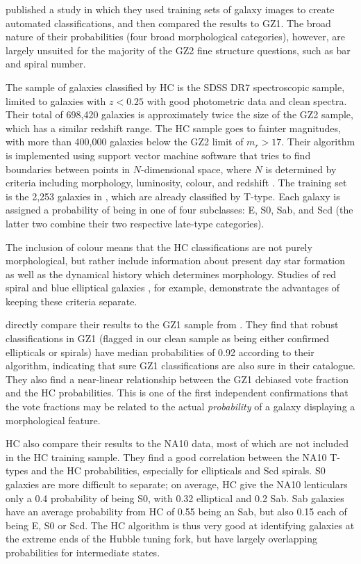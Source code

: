 \documentclass[useAMS,usenatbib]{mn2e}
\begin{document}
\citet[][HC]{hue11} published a study in which they used training sets of galaxy images to create automated classifications, and then compared the results to GZ1. The broad nature of their probabilities (four broad morphological categories), however, are largely unsuited for the majority of the GZ2 fine structure questions, such as bar and spiral number. 

The sample of galaxies classified by HC is the SDSS DR7 spectroscopic sample, limited to galaxies with $z<0.25$ with good photometric data and clean spectra. Their total of 698,420 galaxies is approximately twice the size of the GZ2 sample, which has a similar redshift range. The HC sample goes to fainter magnitudes, with more than 400,000 galaxies below the GZ2 limit of $m_r>17$. Their algorithm is implemented using support vector machine software that tries to find boundaries between points in $N$-dimensional space, where $N$ is determined by criteria including morphology, luminosity, colour, and redshift \citep{hue08}. The training set is the 2,253 galaxies in \citet{fuk07}, which are already classified by T-type. Each galaxy is assigned a probability of being in one of four subclasses: E, S0, Sab, and Scd (the latter two combine their two respective late-type categories). 

The inclusion of colour means that the HC classifications are not purely morphological, but rather include information about present day star formation as well as the dynamical history which determines morphology. Studies of red spiral \citep{mas10a} and blue elliptical galaxies \citep{sch09}, for example, demonstrate the advantages of keeping these criteria separate. 

\citet{hue11} directly compare their results to the GZ1 sample from \citet{lin11}. They find that robust classifications in GZ1 (flagged in our clean sample as being either confirmed ellipticals or spirals) have median probabilities of 0.92 according to their algorithm, indicating that sure GZ1 classifications are also sure in their catalogue. They also find a near-linear relationship between the GZ1 debiased vote fraction and the HC probabilities. This is one of the first independent confirmations that the vote fractions may be related to the actual {\em probability} of a galaxy displaying a morphological feature. 


HC also compare their results to the NA10 data, most of which are not included in the HC training sample. They find a good correlation between the NA10 T-types and the HC probabilities, especially for ellipticals and Scd spirals. S0 galaxies are more difficult to separate; on average, HC give the NA10 lenticulars only a 0.4 probability of being S0, with 0.32 elliptical and 0.2 Sab. Sab galaxies have an average probability from HC of 0.55 being an Sab, but also 0.15 each of being E, S0 or Scd. The HC algorithm is thus very good at identifying galaxies at the extreme ends of the Hubble tuning fork, but have largely overlapping probabilities for intermediate states. 
\end{document}
